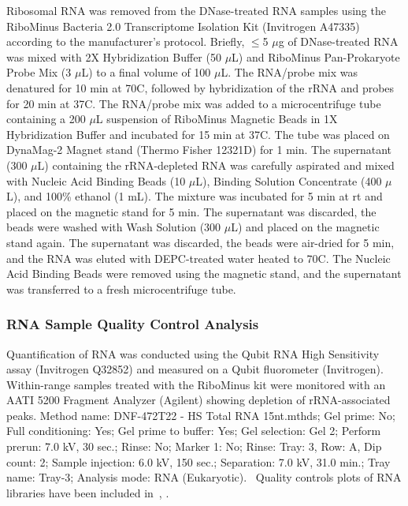 Ribosomal RNA was removed from the DNase-treated RNA samples using the RiboMinus Bacteria 2.0 Transcriptome Isolation Kit (Invitrogen A47335) according to the manufacturer’s protocol. Briefly, $\le$5 $\mu$g of DNase-treated RNA was mixed with 2X Hybridization Buffer (50 $\mu$L) and RiboMinus Pan-Prokaryote Probe Mix (3 $\mu$L) to a final volume of 100 $\mu$L. The RNA/probe mix was denatured for 10 min at 70\textdegree C, followed by hybridization of the rRNA and probes for 20 min at 37\textdegree C. The RNA/probe mix was added to a microcentrifuge tube containing a 200 $\mu$L suspension of RiboMinus Magnetic Beads in 1X Hybridization Buffer and incubated for 15 min at 37\textdegree C. The tube was placed on DynaMag-2 Magnet stand (Thermo Fisher 12321D) for 1 min. The supernatant (300 $\mu$L) containing the rRNA-depleted RNA was carefully aspirated and mixed with Nucleic Acid Binding Beads (10 $\mu$L), Binding Solution Concentrate (400 $\mu$L), and 100\% ethanol (1 mL). The mixture was incubated for 5 min at rt and placed on the magnetic stand for 5 min. The supernatant was discarded, the beads were washed with Wash Solution (300 $\mu$L) and placed on the magnetic stand again. The supernatant was discarded, the beads were air-dried for 5 min, and the RNA was eluted with DEPC-treated water heated to 70\textdegree C. The Nucleic Acid Binding Beads were removed using the magnetic stand, and the supernatant was transferred to a fresh microcentrifuge tube. 

\subsubsection{RNA Sample Quality Control Analysis} \label{sec:methods-ill-qc}
Quantification of RNA was conducted using the Qubit RNA High Sensitivity assay (Invitrogen Q32852) and measured on a Qubit fluorometer (Invitrogen). Within-range samples treated with the RiboMinus kit were monitored with an AATI 5200 Fragment Analyzer (Agilent) showing depletion of rRNA-associated peaks. Method name: DNF-472T22 - HS Total RNA 15nt.mthds; Gel prime: No; Full conditioning: Yes; Gel prime to buffer: Yes; Gel selection: Gel 2; Perform prerun: 7.0 kV, 30 sec.; Rinse: No; Marker 1: No; Rinse: Tray: 3, Row: A, Dip count: 2; Sample injection: 6.0 kV, 150 sec.; Separation: 7.0 kV, 31.0 min.; Tray name: Tray-3; Analysis mode: RNA (Eukaryotic).%
~Quality controls plots of RNA libraries have been included in~, .

